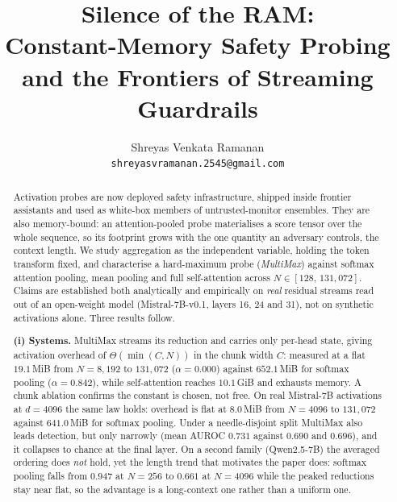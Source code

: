 \documentclass[10pt]{article}
\title{\textbf{Silence of the RAM:}\\[3pt]
\Large Constant-Memory Safety Probing and the Frontiers of Streaming Guardrails}
\author{%
  \normalsize Shreyas Venkata Ramanan\\[2pt]
  \normalsize \texttt{shreyasvramanan.2545@gmail.com}%
}
\date{}
\theoremstyle{plain}
\theoremstyle{definition}
\theoremstyle{remark}
\begin{document}
\maketitle
\vspace{-2.2em}

\begin{abstract}
\setlength{\parindent}{0pt}%
\setlength{\parskip}{0.5em plus 0.1em minus 0.1em}%
\noindent
Activation probes are now deployed safety infrastructure, shipped inside frontier
assistants and used as white-box members of untrusted-monitor ensembles. They are also
memory-bound: an attention-pooled probe materialises a score tensor over the whole
sequence, so its footprint grows with the one quantity an adversary controls, the context
length. We study aggregation as the independent variable, holding the token transform
fixed, and characterise a hard-maximum probe (\emph{MultiMax}) against softmax attention
pooling, mean pooling and full self-attention across $N \in [128,\,131{,}072]$. Claims are
established both analytically and empirically on \emph{real} residual streams read out of
an open-weight model (Mistral-7B-v0.1, layers 16, 24 and 31), not on synthetic activations
alone. Three results follow.

\vspace{0.5em}
\noindent
\textbf{(i) Systems.} MultiMax streams its reduction and carries only
per-head state, giving activation overhead of $\Theta(\min(C,N))$ in the chunk width $C$:
measured at a flat $19.1$\,MiB from $N{=}8{,}192$ to $131{,}072$ ($\alpha{=}0.000$)
against $652.1$\,MiB for softmax pooling ($\alpha{=}0.842$), while self-attention reaches
$10.1$\,GiB and exhausts memory. A chunk ablation confirms the constant is chosen, not
free. On real Mistral-7B activations at $d{=}4096$ the same law holds: overhead is flat at
$8.0$\,MiB from $N{=}4096$ to $131{,}072$ against $641.0$\,MiB for softmax pooling. Under a
needle-disjoint split MultiMax also leads detection, but only narrowly (mean AUROC $0.731$
against $0.690$ and $0.696$), and it collapses to chance at the final layer. On a second
family (Qwen2.5-7B) the averaged ordering does \emph{not} hold, yet the length trend that
motivates the paper does: softmax pooling falls from $0.947$ at $N{=}256$ to $0.661$ at
$N{=}4096$ while the peaked reductions stay near flat, so the advantage is a long-context
one rather than a uniform one.


\end{abstract}
\end{document}
